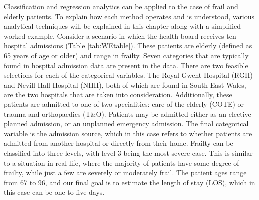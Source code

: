 \documentclass[../thesis.tex]{subfiles}
\begin{document}
Classification and regression analytics can be applied to the case of frail and elderly patients. To explain how each method operates and is understood, various analytical techniques will be explained in this chapter along with a simplified worked example. Consider a scenario in which the health board receives ten hospital admissions (Table \ref{tab:WEtable}). These patients are elderly (defined as 65 years of age or older) and range in frailty. Seven categories that are typically found in hospital admission data are present in the data. There are two feasible selections for each of the categorical variables. The Royal Gwent Hospital (RGH) and Nevill Hall Hospital (NHH), both of which are found in South East Wales, are the two hospitals that are taken into consideration. Additionally, these patients are admitted to one of two specialities: care of the elderly (COTE) or trauma and orthopaedics (T\&O). Patients may be admitted either as an elective planned admission, or an unplanned emergency admission. The final categorical variable is the admission source, which in this case refers to whether patients are admitted from another hospital or directly from their home. Frailty can be classified into three levels, with level 3 being the most severe case. This is similar to a situation in real life, where the majority of patients have some degree of frailty, while just a few are severely or moderately frail. The patient ages range from 67 to 96, and our final goal is to estimate the length of stay (LOS), which in this case can be one to five days.
\end{document}
